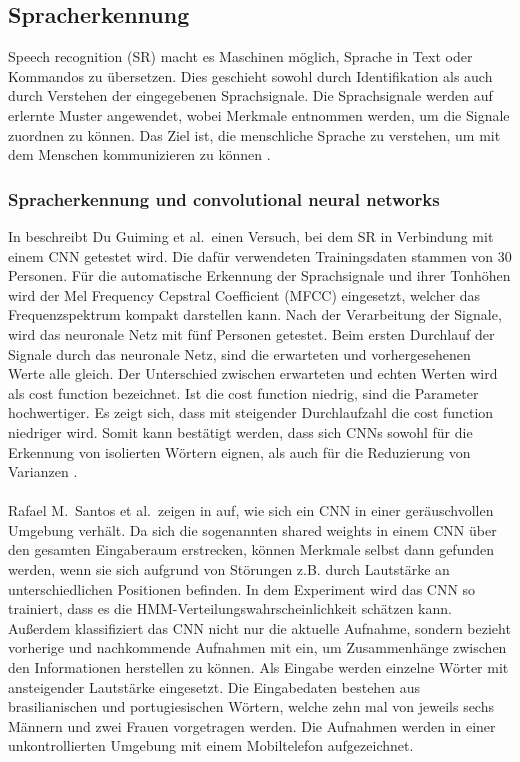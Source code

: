 \subsection{Spracherkennung}
Speech recognition (SR) macht es Maschinen möglich, Sprache in Text oder Kommandos zu übersetzen. Dies geschieht sowohl durch Identifikation als auch durch Verstehen der eingegebenen Sprachsignale. Die Sprachsignale werden auf erlernte Muster angewendet, wobei Merkmale entnommen werden, um die Signale zuordnen zu können. Das Ziel ist, die menschliche Sprache zu verstehen, um mit dem Menschen kommunizieren zu können \cite{technology}.\\

\subsubsection{Spracherkennung und convolutional neural networks}
In \cite{usingcnn} beschreibt Du Guiming et al.~einen Versuch, bei dem SR in Verbindung mit einem CNN getestet wird. Die dafür verwendeten Trainingsdaten stammen von 30 Personen. Für die automatische Erkennung der Sprachsignale und ihrer Tonhöhen wird der Mel Frequency Cepstral Coefficient (MFCC) \cite{MFCC} eingesetzt, welcher das Frequenzspektrum kompakt darstellen kann. Nach der Verarbeitung der Signale, wird das neuronale Netz mit fünf Personen getestet. Beim ersten Durchlauf der Signale durch das neuronale Netz, sind die erwarteten und vorhergesehenen Werte alle gleich. Der Unterschied zwischen erwarteten und echten Werten wird als cost function bezeichnet. Ist die cost function niedrig, sind die Parameter hochwertiger. Es zeigt sich, dass mit steigender Durchlaufzahl die cost function niedriger wird. Somit kann bestätigt werden, dass sich CNNs sowohl für die Erkennung von isolierten Wörtern eignen, als auch für die Reduzierung von Varianzen \cite{usingcnn}.\\
\\
Rafael M.~Santos et al.~zeigen in \cite{noisycnn} auf, wie sich ein CNN in einer geräuschvol\-len Umgebung verhält. Da sich die sogenannten shared weights in einem CNN über den gesamten Eingaberaum erstrecken, können Merkmale selbst dann gefunden werden, wenn sie sich aufgrund von Störungen z.B. durch Lautstärke an unterschiedlichen Positionen befinden. In dem Experiment wird das CNN so trainiert, dass es die HMM-Verteilungswahrscheinlich\-keit schätzen kann. Außerdem klassifiziert das CNN nicht nur die aktuelle Aufnahme, sondern bezieht vorherige und nachkommende Aufnahmen mit ein, um Zusammenhän\-ge zwischen den Informationen herstellen zu können. Als Eingabe werden einzel\-ne Wörter mit ansteigender Lautstärke eingesetzt. Die Eingabedaten bestehen aus brasilianischen und portugiesischen Wörtern, welche zehn mal von jeweils sechs Männern und zwei Frauen vorgetragen werden. Die Aufnahmen werden in einer unkontrollierten Umgebung mit einem Mobiltelefon aufgezeichnet.\\
